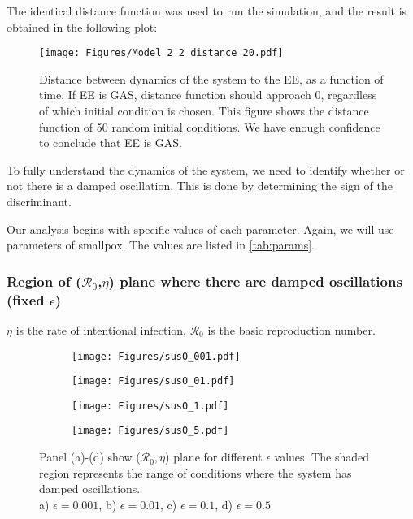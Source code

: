 \documentclass[12pt]{article}
\newcommand{\R}{\mathcal{R}}
\begin{document}
The identical distance function was used to run the simulation, and the result is obtained in the following plot:

\begin{figure}[H]
  \centering
  \texttt{[image: Figures/Model\_2\_2\_distance\_20.pdf]}
  \caption{Distance between dynamics of the system to the EE, as a function of time. If EE is GAS, distance function should approach 0, regardless of which initial condition is chosen. This figure shows the distance function of 50 random initial conditions. We have enough confidence to conclude that EE is GAS.}
\end{figure}

To fully understand the dynamics of the system, we need to identify whether or not there is a damped oscillation. This is done by determining the sign of the discriminant.

Our analysis begins with specific values of each parameter. Again, we will use parameters of smallpox. The values are listed in \autoref{tab:params}.
\subsubsection{Region of ($\R_0$,$\eta$) plane where there are damped oscillations (fixed $\epsilon$)}

$\eta$ is the rate of intentional infection, $\R_0$ is the basic reproduction number.

\begin{figure}[h]
\centering

\begin{subfigure}[t]{.4\textwidth}
\centering
\texttt{[image: Figures/sus0\_001.pdf]}
        \caption{}\label{fig:fig_aa}
\end{subfigure}
%
\begin{subfigure}[t]{.4\textwidth}
\centering
\texttt{[image: Figures/sus0\_01.pdf]}
\caption{}\label{fig:fig_bb}
\end{subfigure}

\medskip

\begin{subfigure}[t]{.4\textwidth}
\centering
\vspace{0pt}%
\texttt{[image: Figures/sus0\_1.pdf]}
\caption{}\label{fig:fig_cc}
\end{subfigure}
%
\begin{subfigure}[t]{.4\textwidth}
\centering
\vspace{0pt}%
\texttt{[image: Figures/sus0\_5.pdf]}
\caption{}\label{fig:fig_dd}
\end{subfigure}
%
\begin{minipage}[t]{0.9\textwidth}
\caption{Panel (a)-(d) show ($\R_0,\eta$) plane for different $\epsilon$ values. The shaded region represents the range of conditions where the system has damped oscillations.\\
a) $\epsilon=0.001$, b) $\epsilon=0.01$, c) $\epsilon=0.1$, d) $\epsilon=0.5$}
\end{minipage}
\end{figure}
\end{document}
